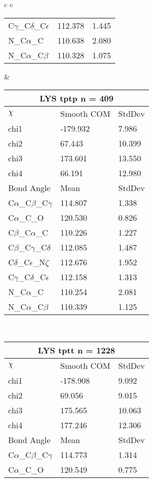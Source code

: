 \begin{longtable}{ c c }
\begin{tabular}{ l l l }
  C$\gamma$\_C$\delta$\_C$\epsilon$ & 112.378 & 1.445\\
  N\_C$\alpha$\_C & 110.638 & 2.080\\
  N\_C$\alpha$\_C$\beta$ & 110.328 & 1.075\\
  \bottomrule
  \end{tabular}
  &
  \begin{tabular}{ l l l }
  \toprule
  \multicolumn{3}{c}{LYS \textbf{tptp} n = 409} \\ \toprule
  $\chi$       & Smooth COM & StdDev \\ \midrule
  chi1 & -179.932 & 7.986 \\ 
  chi2 & 67.443 & 10.399 \\ 
  chi3 & 173.601 & 13.550 \\ 
  chi4 & 66.191 & 12.980 \\ \midrule
  Bond Angle   & Mean     & StdDev \\ \midrule
  C$\alpha$\_C$\beta$\_C$\gamma$ & 114.807 & 1.338\\
  C$\alpha$\_C\_O & 120.530 & 0.826\\
  C$\beta$\_C$\alpha$\_C & 110.226 & 1.227\\
  C$\beta$\_C$\gamma$\_C$\delta$ & 112.085 & 1.487\\
  C$\delta$\_C$\epsilon$\_N$\zeta$ & 112.676 & 1.952\\
  C$\gamma$\_C$\delta$\_C$\epsilon$ & 112.158 & 1.313\\
  N\_C$\alpha$\_C & 110.254 & 2.081\\
  N\_C$\alpha$\_C$\beta$ & 110.339 & 1.125\\
  \bottomrule
  \end{tabular}
  \\
  \begin{tabular}{ l l l }
  \toprule
  \multicolumn{3}{c}{LYS \textbf{tptt} n = 1228} \\ \toprule
  $\chi$       & Smooth COM & StdDev \\ \midrule
  chi1 & -178.908 & 9.092 \\ 
  chi2 & 69.056 & 9.015 \\ 
  chi3 & 175.565 & 10.063 \\ 
  chi4 & 177.246 & 12.306 \\ \midrule
  Bond Angle   & Mean     & StdDev \\ \midrule
  C$\alpha$\_C$\beta$\_C$\gamma$ & 114.773 & 1.314\\
  C$\alpha$\_C\_O & 120.549 & 0.775\\

\end{tabular}
\end{longtable}
